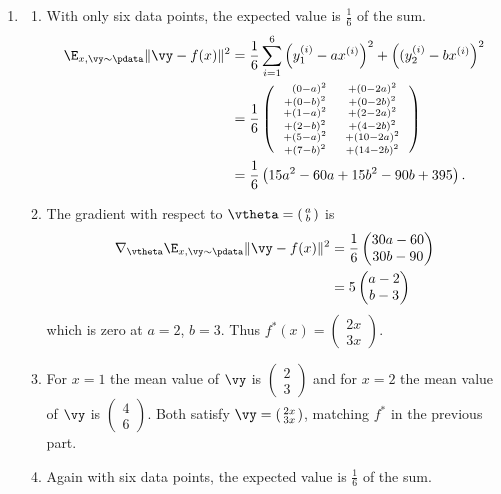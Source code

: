 \documentclass{article}
\newcommand{\twovector}[2]{ \begin{smallmatrix} #1 \\ #2 \end{smallmatrix} }
\newcommand{\ptwovector}[2]{ \left( \twovector{#1}{#2} \right) }
\begin{document}
\begin{enumerate}

\item \label{DFN_ex_calculusofvariations_solution}
\begin{enumerate}
    \item With only six data points, the expected value is $\frac16$ of the sum.
    \begin{align*}
        \E_{x,\vy\sim\pdata}\lVert \vy - f(x)\rVert^2 & = \frac16 \sum_{i=1}^6 \left(y^{(i)}_1-ax^{(i)}\right)^2 + \left((y^{(i)}_2-bx^{(i)}\right)^2 \\
        & = \frac{1}{6} \left(
                \begin{array}{c c}
                \twovector{\phantom{+}(0-a)^2}{+(0-b)^2} & \twovector{+(0 -2a)^2}{+(0 -2b)^2} \\
                \twovector{         + (1-a)^2}{+(2-b)^2} & \twovector{+(2 -2a)^2}{+(4 -2b)^2} \\
                \twovector{         + (5-a)^2}{+(7-b)^2} & \twovector{+(10-2a)^2}{+(14-2b)^2} \\
                \end{array}
                \right) \\
        & = \frac16 \left( 15a^2 - 60a + 15b^2 - 90b + 395 \right).
    \end{align*}
    \item The gradient with respect to $\vtheta = \ptwovector{a}{b}$ is
    \begin{align*}
        \nabla_\vtheta \E_{x,\vy\sim\pdata}\lVert \vy - f(x)\rVert^2 & = \frac16 \begin{pmatrix} 30a - 60 \\ 30b - 90 \end{pmatrix} \\
        & = 5 \begin{pmatrix}a - 2 \\ b - 3 \end{pmatrix}
    \end{align*}
    which is zero at $a = 2$, $b = 3$. Thus $f^*(x) = \ptwovector{2x}{3x}$.
    \item For $x = 1$ the mean value of $\vy$ is $\ptwovector{2}{3}$ and for $x = 2$ the mean value of $\vy$ is $\ptwovector{4}{6}$. Both satisfy $\vy = \ptwovector{2x}{3x}$, matching $f^*$ in the previous part.
    \item Again with six data points, the expected value is $\frac16$ of the sum.

\end{enumerate}
\end{enumerate}
\end{document}
